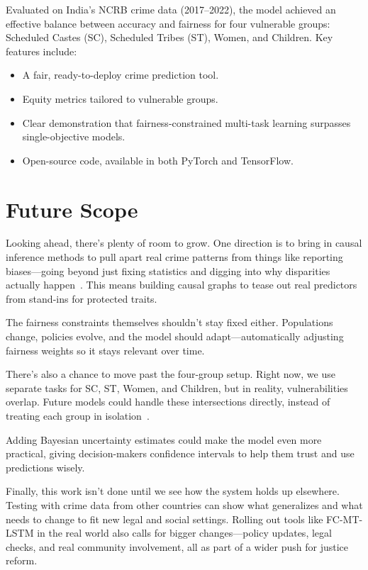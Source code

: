 \documentclass[conference]{IEEEtran}
\begin{document}
Evaluated on India's NCRB crime data (2017--2022), the model achieved an effective balance between accuracy and fairness for four vulnerable groups: Scheduled Castes (SC), Scheduled Tribes (ST), Women, and Children. Key features include:

\begin{itemize}
    \item A fair, ready-to-deploy crime prediction tool.
    \item Equity metrics tailored to vulnerable groups.
    \item Clear demonstration that fairness-constrained multi-task learning surpasses single-objective models.
    \item Open-source code, available in both PyTorch and TensorFlow.
\end{itemize}

\section{Future Scope}

Looking ahead, there's plenty of room to grow. One direction is to bring in causal inference methods to pull apart real crime patterns from things like reporting biases---going beyond just fixing statistics and digging into why disparities actually happen~\cite{thompson2023causal}. This means building causal graphs to tease out real predictors from stand-ins for protected traits.

The fairness constraints themselves shouldn't stay fixed either. Populations change, policies evolve, and the model should adapt---automatically adjusting fairness weights so it stays relevant over time.

There's also a chance to move past the four-group setup. Right now, we use separate tasks for SC, ST, Women, and Children, but in reality, vulnerabilities overlap. Future models could handle these intersections directly, instead of treating each group in isolation~\cite{lee2024intersectional}.

Adding Bayesian uncertainty estimates could make the model even more practical, giving decision-makers confidence intervals to help them trust and use predictions wisely.

Finally, this work isn't done until we see how the system holds up elsewhere. Testing with crime data from other countries can show what generalizes and what needs to change to fit new legal and social settings. Rolling out tools like FC-MT-LSTM in the real world also calls for bigger changes---policy updates, legal checks, and real community involvement, all as part of a wider push for justice reform.
\end{document}
